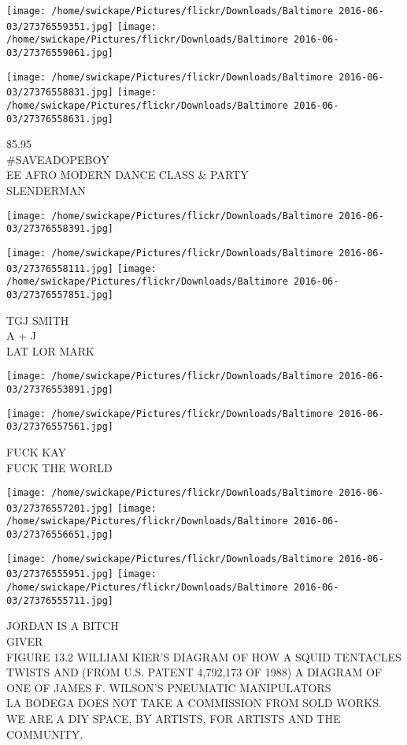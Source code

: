 \documentclass[10pt,letterpaper]{article}
\begin{document}
\texttt{[image: /home/swickape/Pictures/flickr/Downloads/Baltimore 2016-06-03/27376559351.jpg]}
\texttt{[image: /home/swickape/Pictures/flickr/Downloads/Baltimore 2016-06-03/27376559061.jpg]}

\texttt{[image: /home/swickape/Pictures/flickr/Downloads/Baltimore 2016-06-03/27376558831.jpg]}
\texttt{[image: /home/swickape/Pictures/flickr/Downloads/Baltimore 2016-06-03/27376558631.jpg]}

\$5.95\\
\#SAVEADOPEBOY\\
EE AFRO MODERN DANCE CLASS \& PARTY\\
SLENDERMAN
\pagebreak

\texttt{[image: /home/swickape/Pictures/flickr/Downloads/Baltimore 2016-06-03/27376558391.jpg]}

\vspace{0.25in}
\texttt{[image: /home/swickape/Pictures/flickr/Downloads/Baltimore 2016-06-03/27376558111.jpg]}
\texttt{[image: /home/swickape/Pictures/flickr/Downloads/Baltimore 2016-06-03/27376557851.jpg]}

TGJ SMITH\\
A + J\\
LAT LOR MARK
\pagebreak

\texttt{[image: /home/swickape/Pictures/flickr/Downloads/Baltimore 2016-06-03/27376553891.jpg]}

\vspace{0.25in}
\texttt{[image: /home/swickape/Pictures/flickr/Downloads/Baltimore 2016-06-03/27376557561.jpg]}

FUCK KAY\\
FUCK THE WORLD
\pagebreak

\texttt{[image: /home/swickape/Pictures/flickr/Downloads/Baltimore 2016-06-03/27376557201.jpg]}
\texttt{[image: /home/swickape/Pictures/flickr/Downloads/Baltimore 2016-06-03/27376556651.jpg]}

\texttt{[image: /home/swickape/Pictures/flickr/Downloads/Baltimore 2016-06-03/27376555951.jpg]}
\texttt{[image: /home/swickape/Pictures/flickr/Downloads/Baltimore 2016-06-03/27376555711.jpg]}

JORDAN IS A BITCH\\
GIVER\\
FIGURE 13.2 WILLIAM KIER'S DIAGRAM OF HOW A SQUID TENTACLES TWISTS AND (FROM U.S. PATENT 4,792,173 OF 1988) A DIAGRAM OF ONE OF JAMES F. WILSON'S PNEUMATIC MANIPULATORS\\
LA BODEGA DOES NOT TAKE A COMMISSION FROM SOLD WORKS.  WE ARE A DIY SPACE, BY ARTISTS, FOR ARTISTS AND THE COMMUNITY.
\pagebreak
\end{document}
